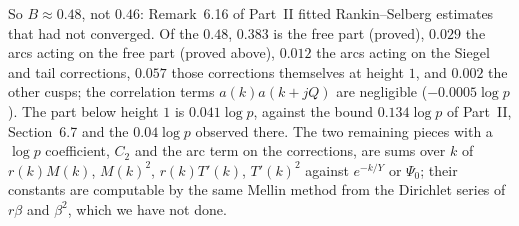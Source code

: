 \documentclass[11pt]{amsart}
\theoremstyle{remark}
\begin{document}
So $B\approx0.48$, not $0.46$: Remark~6.16 of Part~II fitted Rankin--Selberg estimates that had not converged. Of the $0.48$, $0.383$ is the free part (proved), $0.029$ the arcs acting on the free part (proved above), $0.012$ the arcs acting on the Siegel and tail corrections, $0.057$ those corrections themselves at height $1$, and $0.002$ the other cusps; the correlation terms $a(k)a(k+jQ)$ are negligible ($-0.0005\log p$). The part below height $1$ is $0.041\log p$, against the bound $0.134\log p$ of Part~II, Section~6.7 and the $0.04\log p$ observed there. The two remaining pieces with a $\log p$ coefficient, $C_2$ and the arc term on the corrections, are sums over $k$ of $r(k)M(k)$, $M(k)^2$, $r(k)T'(k)$, $T'(k)^2$ against $e^{-k/Y}$ or $\Psi_0$; their constants are computable by the same Mellin method from the Dirichlet series of $r\beta$ and $\beta^2$, which we have not done.
\end{document}
